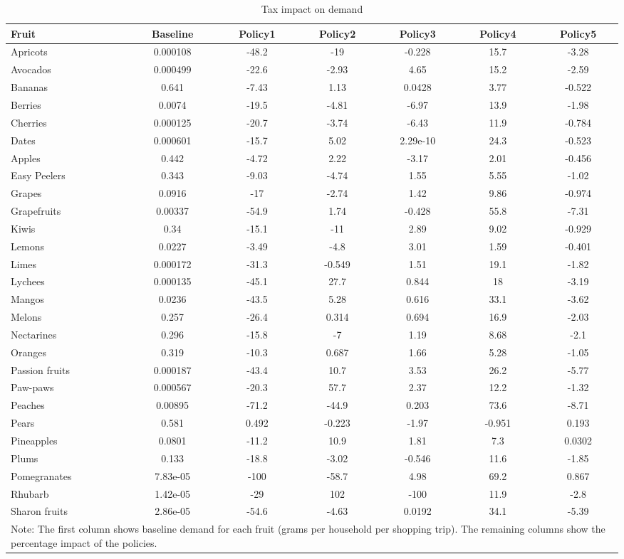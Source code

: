 \documentclass[11pt]{article}
\begin{document}
\begin{table}[h]
\caption{Tax impact on demand}
\label{table:tax impact 1}
\begin{center}
\begin{tabular}{lcccccc} \hline \hline
Fruit & Baseline & Policy1 & Policy2 & Policy3 & Policy4 & Policy5 \\ \hline
Apricots &0.000108 &-48.2 &-19 &-0.228 &15.7 &-3.28 \\
Avocados &0.000499 &-22.6 &-2.93 &4.65 &15.2 &-2.59 \\
Bananas &0.641 &-7.43 &1.13 &0.0428 &3.77 &-0.522 \\
Berries &0.0074 &-19.5 &-4.81 &-6.97 &13.9 &-1.98 \\
Cherries &0.000125 &-20.7 &-3.74 &-6.43 &11.9 &-0.784 \\
\hline
Dates &0.000601 &-15.7 &5.02 &2.29e-10 &24.3 &-0.523 \\
Apples &0.442 &-4.72 &2.22 &-3.17 &2.01 &-0.456 \\
Easy Peelers &0.343 &-9.03 &-4.74 &1.55 &5.55 &-1.02 \\
Grapes &0.0916 &-17 &-2.74 &1.42 &9.86 &-0.974 \\
Grapefruits &0.00337 &-54.9 &1.74 &-0.428 &55.8 &-7.31 \\
\hline
Kiwis &0.34 &-15.1 &-11 &2.89 &9.02 &-0.929 \\
Lemons &0.0227 &-3.49 &-4.8 &3.01 &1.59 &-0.401 \\
Limes &0.000172 &-31.3 &-0.549 &1.51 &19.1 &-1.82 \\
Lychees &0.000135 &-45.1 &27.7 &0.844 &18 &-3.19 \\
Mangos &0.0236 &-43.5 &5.28 &0.616 &33.1 &-3.62 \\
\hline
Melons &0.257 &-26.4 &0.314 &0.694 &16.9 &-2.03 \\
Nectarines &0.296 &-15.8 &-7 &1.19 &8.68 &-2.1 \\
Oranges &0.319 &-10.3 &0.687 &1.66 &5.28 &-1.05 \\
Passion fruits &0.000187 &-43.4 &10.7 &3.53 &26.2 &-5.77 \\
Paw-paws &0.000567 &-20.3 &57.7 &2.37 &12.2 &-1.32 \\
\hline
Peaches &0.00895 &-71.2 &-44.9 &0.203 &73.6 &-8.71 \\
Pears &0.581 &0.492 &-0.223 &-1.97 &-0.951 &0.193 \\
Pineapples &0.0801 &-11.2 &10.9 &1.81 &7.3 &0.0302 \\
Plums &0.133 &-18.8 &-3.02 &-0.546 &11.6 &-1.85 \\
Pomegranates &7.83e-05 &-100 &-58.7 &4.98 &69.2 &0.867 \\
\hline
Rhubarb &1.42e-05 &-29 &102 &-100 &11.9 &-2.8 \\
Sharon fruits &2.86e-05 &-54.6 &-4.63 &0.0192 &34.1 &-5.39 \\
 \hline \hline
\multicolumn{7}{p{0.8 \textwidth}}{Note: The first column shows baseline demand for each fruit (grams per household per shopping trip). The remaining columns show the percentage impact of the policies.}
\end{tabular}
\end{center}
\end{table}
\end{document}
